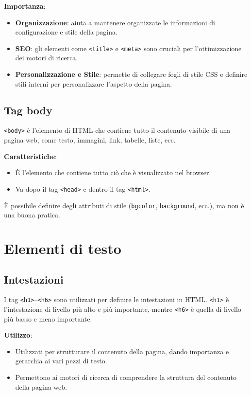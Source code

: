 \textbf{Importanza}:
\begin{itemize}
    \item \textbf{Organizzazione}: aiuta a mantenere organizzate le informazioni di configurazione e stile della pagina.
    \item \textbf{SEO}: gli elementi come \texttt{<title>} e \texttt{<meta>} sono cruciali per l'ottimizzazione dei motori di ricerca.
    \item \textbf{Personalizzazione e Stile}: permette di collegare fogli di stile CSS e definire stili interni per personalizzare l'aspetto della pagina.
\end{itemize}

\subsection{Tag body}

\texttt{<body>} è l'elemento di HTML che contiene tutto il contenuto visibile di una pagina web, come testo, immagini, link, tabelle, liste, ecc.

\textbf{Caratteristiche}:
\begin{itemize}
    \item È l'elemento che contiene tutto ciò che è visualizzato nel browser.
    \item Va dopo il tag \texttt{<head>} e dentro il tag \texttt{<html>}.
\end{itemize}

È possibile definire degli attributi di stile (\texttt{bgcolor}, \texttt{background}, ecc.), ma non è una buona pratica.

\section{Elementi di testo}

\subsection{Intestazioni}

I tag \texttt{<h1>}--\texttt{<h6>} sono utilizzati per definire le intestazioni in HTML. \texttt{<h1>} è l'intestazione di livello più alto e più importante, mentre \texttt{<h6>} è quella di livello più basso e meno importante.

\textbf{Utilizzo}:
\begin{itemize}
    \item Utilizzati per strutturare il contenuto della pagina, dando importanza e gerarchia ai vari pezzi di testo.
    \item Permettono ai motori di ricerca di comprendere la struttura del contenuto della pagina web.
\end{itemize}

